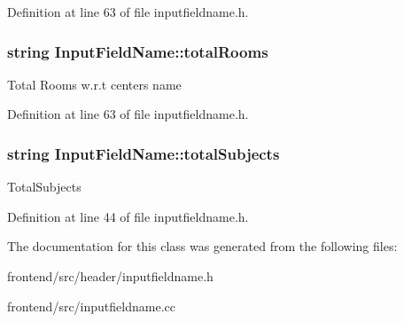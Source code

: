 \-Definition at line 63 of file inputfieldname.\-h.

\hypertarget{classInputFieldName_a51fe8230341d7863ffd4672f2c986beb}{
\subsubsection[{total\-Rooms}]{\setlength{\rightskip}{0pt plus 5cm}string {\bf \-Input\-Field\-Name\-::total\-Rooms}}}\label{classInputFieldName_a51fe8230341d7863ffd4672f2c986beb}
\-Total \-Rooms w.\-r.\-t centers name 

\-Definition at line 63 of file inputfieldname.\-h.

\hypertarget{classInputFieldName_ac58130077f39d82aaf447b1a67e9f70f}{
\subsubsection[{total\-Subjects}]{\setlength{\rightskip}{0pt plus 5cm}string {\bf \-Input\-Field\-Name\-::total\-Subjects}}}\label{classInputFieldName_ac58130077f39d82aaf447b1a67e9f70f}
\-Total\-Subjects 

\-Definition at line 44 of file inputfieldname.\-h.



\-The documentation for this class was generated from the following files\-:\begin{DoxyCompactItemize}
\item 
frontend/src/header/inputfieldname.\-h\item 
frontend/src/inputfieldname.\-cc\end{DoxyCompactItemize}
